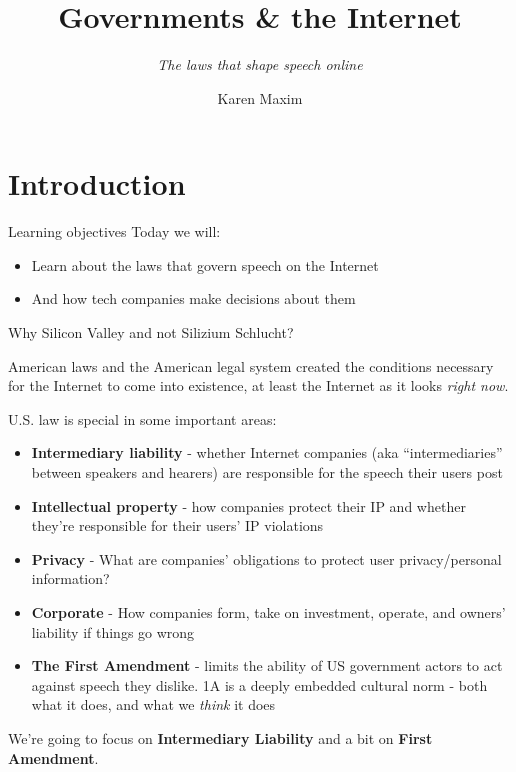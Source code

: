 \documentclass[nobackground,dvipsnames,table]{beamer}
\title[Governments \& the Internet]{\LARGE{Governments \& the Internet}}
\subtitle{\small{\emph{The laws that shape speech online}}}
\author[Maxim]{\large{Karen Maxim}}
\date[]{}
\begin{document}

\begin{frame}
	\titlepage
\end{frame}


\section{Introduction}

\begin{frame}{Learning objectives}
	Today we will:
	\begin{itemize}
		\item Learn about the laws that govern speech on the Internet
		\item And how tech companies make decisions about them
	\end{itemize}
\end{frame}


\begin{frame}{Why Silicon Valley and not Silizium Schlucht?}
\footnotesize{
American laws and the American legal system created the conditions necessary for the Internet to come into existence, at least the Internet as it looks \emph{right now}. 
\vspace{0.5ex}

U.S. law is special in some important areas:
\begin{itemize}
    \item \textbf{Intermediary liability} - whether Internet companies (aka “intermediaries” between speakers and hearers) are responsible for the speech their users post
    \item \textbf{Intellectual property} - how companies protect their IP and whether they’re responsible for their users’ IP violations
    \item \textbf{Privacy} - What are companies’ obligations to protect user privacy/personal information?
    \item \textbf{Corporate} - How companies form, take on investment, operate, and owners’ liability if things go wrong
    \item \textbf{The First Amendment} - limits the ability of US government actors to act against speech they dislike. 1A is a deeply embedded cultural norm - both what it does, and what we \emph{think} it does 
\end{itemize}

We’re going to focus on \textbf{Intermediary Liability} and a bit on \textbf{First Amendment}.
}

        
\end{frame}
\end{document}
